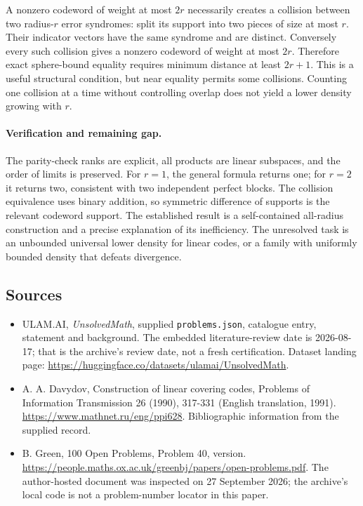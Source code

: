 \documentclass[11pt,a4paper]{article}
\begin{document}
A nonzero codeword of weight at most $2r$ necessarily creates a collision between two radius-$r$ error syndromes: split its support into two pieces of size at most $r$. Their indicator vectors have the same syndrome and are distinct. Conversely every such collision gives a nonzero codeword of weight at most $2r$. Therefore exact sphere-bound equality requires minimum distance at least $2r+1$. This is a useful structural condition, but near equality permits some collisions. Counting one collision at a time without controlling overlap does not yield a lower density growing with $r$.

\paragraph{Verification and remaining gap.}
The parity-check ranks are explicit, all products are linear subspaces, and the order of limits is preserved. For $r=1$, the general formula returns one; for $r=2$ it returns two, consistent with two independent perfect blocks. The collision equivalence uses binary addition, so symmetric difference of supports is the relevant codeword support. The established result is a self-contained all-radius construction and a precise explanation of its inefficiency. The unresolved task is an unbounded universal lower density for linear codes, or a family with uniformly bounded density that defeats divergence.

\subsection{Sources}

{\small

\begin{itemize}

\item[\hypertarget{source:statement:1}{S1}] ULAM.AI, \emph{UnsolvedMath}, supplied \texttt{problems.json}, catalogue entry, statement and background. The embedded literature-review date is 2026-08-17; that is the archive’s review date, not a fresh certification. Dataset landing page: \url{https://huggingface.co/datasets/ulamai/UnsolvedMath}.

\item[\hypertarget{source:statement:2}{S2}] A. A. Davydov, Construction of linear covering codes, Problems of Information Transmission 26 (1990), 317-331 (English translation, 1991). \url{https://www.mathnet.ru/eng/ppi628}. Bibliographic information from the supplied record.

\item[\hypertarget{source:statement:3}{S3}] B. Green, 100 Open Problems, Problem 40, version. \url{https://people.maths.ox.ac.uk/greenbj/papers/open-problems.pdf}. The author-hosted document was inspected on 27 September 2026; the archive’s local code is not a problem-number locator in this paper.

\end{itemize}

}

\label{end:statement}
\end{document}
